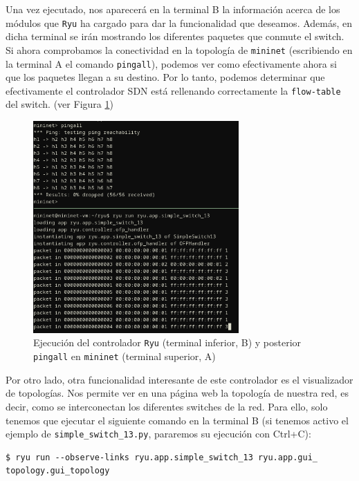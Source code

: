 \documentclass[a4paper, oneside, 12pt]{book}
\begin{document}
	\noindent Una vez ejecutado, nos aparecerá en la terminal B la información acerca de los módulos que \texttt{Ryu} ha cargado para dar la funcionalidad que deseamos. Además, en dicha terminal se irán mostrando los diferentes paquetes que conmute el switch. \\
	
	\noindent Si ahora comprobamos la conectividad en la topología de \texttt{mininet} (escribiendo en la terminal A el comando \texttt{pingall}), podemos ver como efectivamente ahora si que los paquetes llegan a su destino. Por lo tanto, podemos determinar que efectivamente el controlador SDN está rellenando correctamente la \texttt{flow-table} del switch. (ver Figura \ref{img: mn ryu 2}) 
	
	\pagebreak
	
	\begin{figure}[h!]
		\begin{center}
			\includegraphics[width=0.7\textwidth]{img/mn_ryu_2.png}
			\caption{Ejecución del controlador \texttt{Ryu} (terminal inferior, B) y posterior \texttt{pingall} en \texttt{mininet} (terminal superior, A)}
			\label{img: mn ryu 2}	
		\end{center}
	\end{figure}
	
	\noindent Por otro lado, otra funcionalidad interesante de este controlador es el visualizador de topologías. Nos permite ver en una página web la topología de nuestra red, es decir, como se interconectan los diferentes switches de la red. Para ello, solo tenemos que ejecutar el siguiente comando en la terminal B (si tenemos activo el ejemplo de \texttt{simple\_switch\_13.py}, pararemos su ejecución con Ctrl+C):
	\begin{verbatim}
$ ryu run --observe-links ryu.app.simple_switch_13 ryu.app.gui_
topology.gui_topology
	\end{verbatim}
\end{document}
